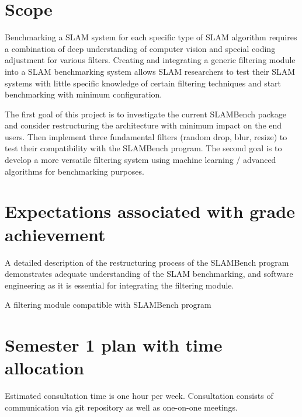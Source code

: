 \documentclass[11pt, oneside, a4paper]{article}
\begin{document}
\section{Scope}
Benchmarking a SLAM system for each specific type of SLAM algorithm requires a combination of deep understanding of computer vision and special coding adjustment for various filters. Creating and integrating a generic filtering module into a SLAM benchmarking system allows SLAM researchers to test their SLAM systems with little specific knowledge of certain filtering techniques and start benchmarking with minimum configuration.

The first goal of this project is to investigate the current SLAMBench package and consider restructuring the architecture with minimum impact on the end users. Then implement three fundamental filters (random drop, blur, resize) to test their compatibility with the SLAMBench program. The second goal is to develop a more versatile filtering system using machine learning / advanced algorithms for benchmarking purposes. 

\section{Expectations associated with grade achievement}

A detailed description of the restructuring process of the SLAMBench program demonstrates adequate understanding of the SLAM benchmarking, and software engineering as it is essential for integrating the filtering module.

\noindent A filtering module compatible with SLAMBench program 

\section{Semester 1 plan with time allocation}

Estimated consultation time is one hour per week. Consultation consists of communication via git repository as well as one-on-one meetings.
\end{document}
